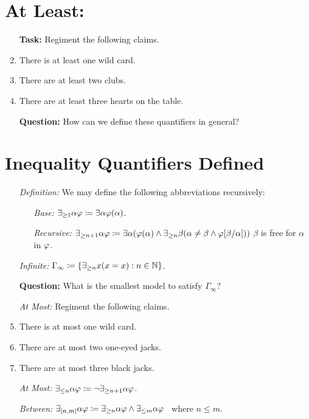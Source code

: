 \documentclass[a4paper, 11pt]{article} %
\begin{document}
\section*{At Least:}

\begin{enumerate}
  \item[\bf Task:] Regiment the following claims.
  \item There is at least one wild card.
  \item There are at least two clubs.
  \item There are at least three hearts on the table.
  \item[\bf Question:] How can we define these quantifiers in general?
\end{enumerate}





\section*{Inequality Quantifiers Defined}

\begin{enumerate}
  \item[\it Definition:] We may define the following abbreviations recursively:
    \begin{itemize}
      \item[\it Base:] $\exists_{\geq 1} \alpha\varphi \coloneq \exists \alpha\varphi(\alpha)$.
      \item[\it Recursive:] $\exists_{\geq n+1} \alpha\varphi \coloneq \exists \alpha(\varphi(\alpha) \wedge \exists_{\geq n} \beta(\alpha \neq \beta \wedge \varphi[\beta/\alpha]))$ $\beta$ is free for $\alpha$ in $\varphi$. 
    \end{itemize}
  \item[\it Infinite:] $\Gamma_{\infty} \coloneq \lbrace\exists_{\geq n} x(x=x): n\in\mathbb{N}\rbrace$.
  \item[\bf Question:] What is the smallest model to satisfy $\Gamma_\infty$?
  \item[\it At Most:] Regiment the following claims.
  \item There is at most one wild card.
  \item There are at most two one-eyed jacks.
  \item There are at most three black jacks.
  \item[\it At Most:] $\exists_{\leq n} \alpha\varphi \coloneq \neg\exists_{\geq n+1} \alpha\varphi$.
  \item[\it Between:] $\exists_{[n,m]} \alpha\varphi \coloneq \exists_{\geq n} \alpha\varphi \wedge \exists_{\leq m} \alpha\varphi$~ where $n\leq m$.
\end{enumerate}
 
\end{document}
